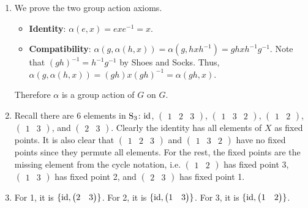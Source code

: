 \begin{enumerate}
    \item We prove the two group action axioms.
    \begin{itemize}
        \item \textbf{Identity}: $\alpha(e, x) = exe^{-1} = x$.
        \item \textbf{Compatibility}: $\alpha(g, \alpha(h, x)) = \alpha(g, hxh^{-1}) = ghxh^{-1}g^{-1}$. Note that $(gh)^{-1} = h^{-1}g^{-1}$ by Shoes and Socks. Thus, $\alpha(g, \alpha(h, x)) = (gh)x(gh)^{-1} = \alpha(gh, x)$.
    \end{itemize}
    Therefore $\alpha$ is a group action of $G$ on $G$.

    \item Recall there are 6 elements in $\mathrm{S}_{3}$: $\mathrm{id}$, $\begin{pmatrix}1 & 2 & 3\end{pmatrix}$, $\begin{pmatrix}1 & 3 & 2\end{pmatrix}$, $\begin{pmatrix}1 & 2\end{pmatrix}$, $\begin{pmatrix}1 & 3\end{pmatrix}$, and $\begin{pmatrix}2 & 3\end{pmatrix}$. Clearly the identity has all elements of $X$ as fixed points. It is also clear that $\begin{pmatrix}1 & 2 & 3\end{pmatrix}$ and $\begin{pmatrix}1 & 3 & 2\end{pmatrix}$ have no fixed points since they permute all elements. For the rest, the fixed points are the missing element from the cycle notation, i.e. $\begin{pmatrix}1 & 2\end{pmatrix}$ has fixed point 3, $\begin{pmatrix}1 & 3\end{pmatrix}$ has fixed point 2, and $\begin{pmatrix}2 & 3\end{pmatrix}$ has fixed point 1.

    \item For 1, it is $\{\mathrm{id}, \begin{pmatrix}2 & 3\end{pmatrix}\}$. For 2, it is $\{\mathrm{id}, \begin{pmatrix}1 & 3\end{pmatrix}\}$. For 3, it is $\{\mathrm{id}, \begin{pmatrix}1 & 2\end{pmatrix}\}$.


\end{enumerate}
